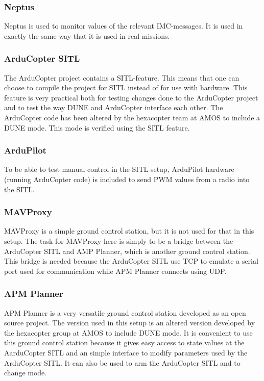 \subsubsection*{Neptus}
Neptus is used to monitor values of the relevant IMC-messages. It is used in exactly the same way that it is used in real missions.
\subsubsection*{ArduCopter SITL}
The ArduCopter project contains a SITL-feature. This means that one can choose to compile the project for SITL instead of for use with hardware. This feature is very practical both for testing changes done to the ArduCopter project and to test the way DUNE and ArduCopter interface each other. The ArduCopter code has been altered by the hexacopter team at AMOS to include a DUNE mode. This mode is verified using the SITL feature.
\subsubsection*{ArduPilot}
To be able to test manual control in the SITL setup, ArduPilot hardware (running ArduCopter code) is included to send PWM values from a radio into the SITL.
\subsubsection*{MAVProxy}
MAVProxy is a simple ground control station, but it is not used for that in this setup. The task for MAVProxy here is simply to be a bridge between the ArduCopter SITL and AMP Planner, which is another ground control station. This bridge is needed because the ArduCopter SITL use TCP to emulate a serial port used for communication while APM Planner connects using UDP.
\subsubsection*{APM Planner}
APM Planner is a very versatile ground control station developed as an open source project. The version used in this setup is an altered version developed by the hexacopter group at AMOS to include DUNE mode. It is convenient to use this ground control station because it gives easy access to state values at the AarduCopter SITL and an simple interface to modify parameters used by the ArduCopter SITL. It can also be used to arm the ArduCopter SITL and to change mode.
